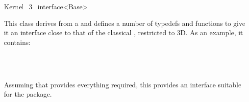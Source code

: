 \begin{ccRefClass}{Kernel_3_interface<Base>}

\ccDefinition
This class derives from a   and defines a number
of typedefs and functions to give it an interface close to that of the
classical , restricted to 3D. As an example, it contains:

\\
\\

Assuming that  provides everything required, this provides
an interface suitable for the  package.

\end{ccRefClass}
